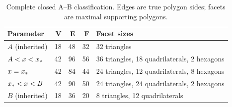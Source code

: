 \par
\begin{table}[h]\centering\small
\caption{Complete closed A--B classification. Edges are true polygon sides; facets are maximal supporting polygons.}\label{tab:classification}
\begin{tabularx}{\linewidth}{@{}lrrrX@{}}\toprule
Parameter & V & E & F & Facet sizes\\\midrule
$A$ (inherited) & 18 & 48 & 32 & 32 triangles \\
$A<x<x_*$ & 42 & 96 & 56 & 36 triangles, 18 quadrilaterals, 2 hexagons \\
$x=x_*$ & 42 & 84 & 44 & 24 triangles, 12 quadrilaterals, 8 hexagons \\
$x_*<x<B$ & 42 & 90 & 50 & 24 triangles, 24 quadrilaterals, 2 hexagons \\
$B$ (inherited) & 18 & 36 & 20 & 8 triangles, 12 quadrilaterals \\
\bottomrule\end{tabularx}
\end{table}\par
